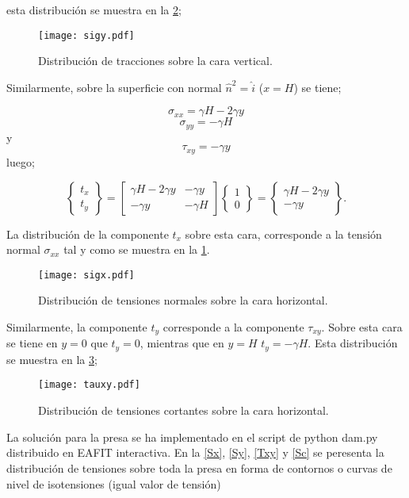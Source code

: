 \documentclass[../notas medios.tex]{subfiles}
\begin{document}
esta distribución se muestra en la \cref{sigy};


\begin{figure}[H]
\centering
	\texttt{[image: sigy.pdf]}
	\caption{Distribución de tracciones sobre la cara vertical.}
	\label{sigx}
\end{figure}


Similarmente, sobre la superficie con normal ${{\hat n}^2} =   \hat i$ ($x=H$) se tiene;

\[{\sigma _{xx}} = \gamma H - 2\gamma y\]
\[{\sigma _{yy}} =  - \gamma H\]
y
\[{\tau _{xy}} =  - \gamma y\]
luego;

\[\left\{ {\begin{array}{*{20}{c}}
{{t_x}}\\
{{t_y}}
\end{array}} \right\} = \left[ {\begin{array}{*{20}{c}}
{\gamma H - 2\gamma y}&{ - \gamma y}\\
{ - \gamma y}&{ - \gamma H}
\end{array}} \right]\left\{ {\begin{array}{*{20}{c}}
1\\
0
\end{array}} \right\} = \left\{ {\begin{array}{*{20}{c}}
{\gamma H - 2\gamma y}\\
{ - \gamma y}
\end{array}} \right\}.\]


La distribución de la componente $t_x$ sobre esta cara, corresponde a la tensión normal $\sigma_{xx}$ tal y como se muestra en la \cref{sigx}. 

\begin{figure}[H]
\centering
	\texttt{[image: sigx.pdf]}
	\caption{Distribución de tensiones normales sobre la cara horizontal.}
	\label{sigy}
\end{figure}

Similarmente, la componente $t_y$ corresponde a la componente $\tau_{xy}$. Sobre esta cara se tiene en $y=0$  que $t_y = 0$, mientras que en $y=H$ $t_y = - \gamma H$. Esta distribución se muestra en la \cref{taoxy};

\begin{figure}[H]
\centering
	\texttt{[image: tauxy.pdf]}
	\caption{Distribución de tensiones cortantes sobre la cara horizontal.}
	\label{taoxy}
\end{figure}


La solución para la presa se ha implementado en el script de python dam.py distribuido en EAFIT interactiva. En la \cref{Sx}, \cref{Sy}, \cref{Txy} y \cref{Sc} se peresenta la distribución de tensiones sobre toda la presa en forma de contornos o curvas de nivel de isotensiones (igual valor de tensión)
\end{document}
